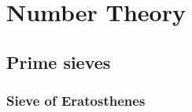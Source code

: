 \chapter{Number Theory}
	\section{Prime sieves}
		\subsection{Sieve of Eratosthenes}
                
